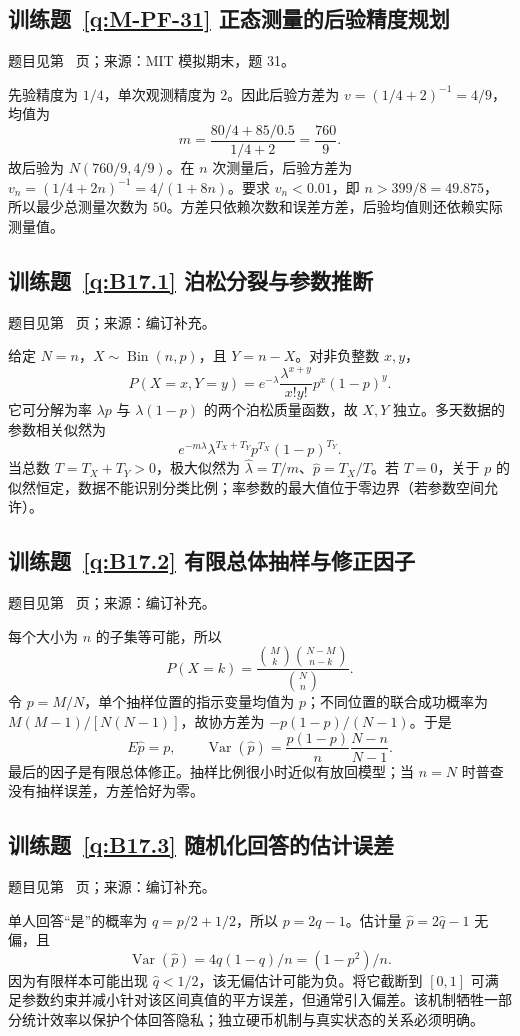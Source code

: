 \documentclass[UTF8,12pt,a4paper,fontset=fandol]{ctexbook}
\begin{document}
\subsection*{训练题~\ref{q:M-PF-31} 正态测量的后验精度规划}\label{a:M-PF-31}{\small 题目见第~\pageref{q:M-PF-31} 页；来源：MIT 模拟期末，题 31。}
\begin{solve}先验精度为 $1/4$，单次观测精度为 $2$。因此后验方差为 $v=(1/4+2)^{-1}=4/9$，均值为\[m=\frac{80/4+85/0.5}{1/4+2}=\frac{760}{9}.\]故后验为 $N(760/9,4/9)$。在 $n$ 次测量后，后验方差为 $v_n=(1/4+2n)^{-1}=4/(1+8n)$。要求 $v_n<0.01$，即 $n>399/8=49.875$，所以最少总测量次数为 $50$。方差只依赖次数和误差方差，后验均值则还依赖实际测量值。\end{solve}

\subsection*{训练题~\ref{q:B17.1} 泊松分裂与参数推断}\label{a:B17.1}{\small 题目见第~\pageref{q:B17.1} 页；来源：编订补充。}
\begin{solve}给定 $N=n$，$X\sim\operatorname{Bin}(n,p)$，且 $Y=n-X$。对非负整数 $x,y$，\[P(X=x,Y=y)=e^{-\lambda}\frac{\lambda^{x+y}}{x!y!}p^x(1-p)^y.\]它可分解为率 $\lambda p$ 与 $\lambda(1-p)$ 的两个泊松质量函数，故 $X,Y$ 独立。多天数据的参数相关似然为\[e^{-m\lambda}\lambda^{T_X+T_Y}p^{T_X}(1-p)^{T_Y}.\]当总数 $T=T_X+T_Y>0$，极大似然为 $\widehat\lambda=T/m$、$\widehat p=T_X/T$。若 $T=0$，关于 $p$ 的似然恒定，数据不能识别分类比例；率参数的最大值位于零边界（若参数空间允许）。\end{solve}

\subsection*{训练题~\ref{q:B17.2} 有限总体抽样与修正因子}\label{a:B17.2}{\small 题目见第~\pageref{q:B17.2} 页；来源：编订补充。}
\begin{solve}每个大小为 $n$ 的子集等可能，所以\[P(X=k)=\frac{\binom Mk\binom{N-M}{n-k}}{\binom Nn}.\]令 $p=M/N$，单个抽样位置的指示变量均值为 $p$；不同位置的联合成功概率为 $M(M-1)/[N(N-1)]$，故协方差为 $-p(1-p)/(N-1)$。于是\[E\widehat p=p,\qquad\operatorname{Var}(\widehat p)=\frac{p(1-p)}n\frac{N-n}{N-1}.\]最后的因子是有限总体修正。抽样比例很小时近似有放回模型；当 $n=N$ 时普查没有抽样误差，方差恰好为零。\end{solve}

\subsection*{训练题~\ref{q:B17.3} 随机化回答的估计误差}\label{a:B17.3}{\small 题目见第~\pageref{q:B17.3} 页；来源：编订补充。}
\begin{solve}单人回答“是”的概率为 $q=p/2+1/2$，所以 $p=2q-1$。估计量 $\widehat p=2\widehat q-1$ 无偏，且\[\operatorname{Var}(\widehat p)=4q(1-q)/n=(1-p^2)/n.\]因为有限样本可能出现 $\widehat q<1/2$，该无偏估计可能为负。将它截断到 $[0,1]$ 可满足参数约束并减小针对该区间真值的平方误差，但通常引入偏差。该机制牺牲一部分统计效率以保护个体回答隐私；独立硬币机制与真实状态的关系必须明确。\end{solve}
\end{document}
